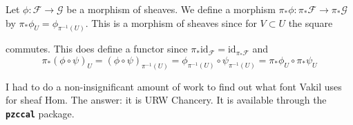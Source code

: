 \documentclass{article}
\newcommand{\id}{\mathrm{id}}
\DeclareMathOperator{\res}{res}
\newcommand{\Fsheaf}{\mathscr{F}}
\newcommand{\Gsheaf}{\mathscr{G}}
\newcommand{\exercise}{\subsubsection} %
\begin{document}
\exercise{} Let $\phi : \Fsheaf \to \Gsheaf$ be a morphism of sheaves. We define a morphism $\pi_* \phi : \pi_* \Fsheaf \to \pi_* \Gsheaf$ by $\pi_*\phi_U = \phi_{\pi^{-1}(U)}$. This is a morphism of sheaves since for $V \subset U$ the square
\begin{center}
\end{center}
commutes. This does define a functor since $\pi_* \id_\Fsheaf = \id_{\pi_* \Fsheaf}$ and 
\[\pi_* (\phi \circ \psi)_U = (\phi \circ \psi)_{\pi^{-1}(U)} = \phi_{\pi^{-1}(U)} \circ \psi_{\pi^{-1}(U)} = \pi_* \phi_U \circ \pi_*\psi_U\]

I had to do a non-insignificant amount of work to find out what font Vakil uses for sheaf Hom. The answer: it is URW Chancery. It is available through the \texttt{\bfseries pzccal} package.
\end{document}
